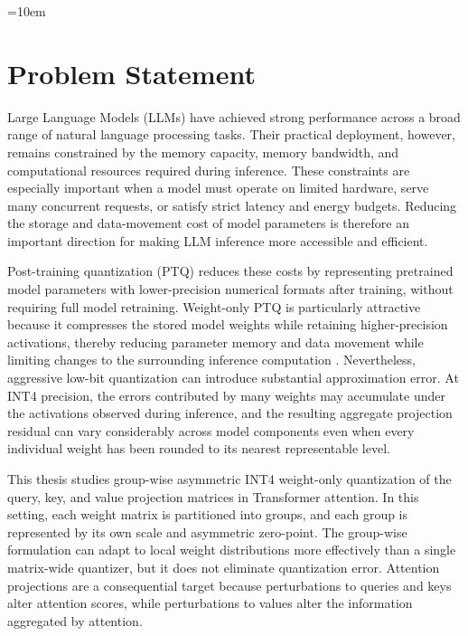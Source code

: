 \sloppy
\emergencystretch=10em

\section{Problem Statement}

Large Language Models (LLMs) have achieved strong performance across a broad range of natural language processing tasks. Their practical deployment, however, remains constrained by the memory capacity, memory bandwidth, and computational resources required during inference. These constraints are especially important when a model must operate on limited hardware, serve many concurrent requests, or satisfy strict latency and energy budgets. Reducing the storage and data-movement cost of model parameters is therefore an important direction for making LLM inference more accessible and efficient.

Post-training quantization (PTQ) reduces these costs by representing pretrained model parameters with lower-precision numerical formats after training, without requiring full model retraining. Weight-only PTQ is particularly attractive because it compresses the stored model weights while retaining higher-precision activations, thereby reducing parameter memory and data movement while limiting changes to the surrounding inference computation \cite{gholami2021survey,nagel2021white,lin2023awq}. Nevertheless, aggressive low-bit quantization can introduce substantial approximation error. At INT4 precision, the errors contributed by many weights may accumulate under the activations observed during inference, and the resulting aggregate projection residual can vary considerably across model components even when every individual weight has been rounded to its nearest representable level.

This thesis studies group-wise asymmetric INT4 weight-only quantization of the query, key, and value projection matrices in Transformer attention. In this setting, each weight matrix is partitioned into groups, and each group is represented by its own scale and asymmetric zero-point. The group-wise formulation can adapt to local weight distributions more effectively than a single matrix-wide quantizer, but it does not eliminate quantization error. Attention projections are a consequential target because perturbations to queries and keys alter attention scores, while perturbations to values alter the information aggregated by attention.


